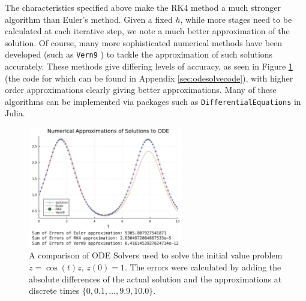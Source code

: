 \documentclass[a4paper,11pt,titlepage]{article}
\theoremstyle{definition}
\theoremstyle{plain}
\theoremstyle{remark}
\begin{document}
The characteristics specified above make the RK4 method a much stronger algorithm than Euler's method. Given a fixed $h$, while more stages need to be calculated at each iterative step, we note a much better approximation of the solution. Of course, many more sophisticated numerical methods have been developed (such as \texttt{Vern9} \cite{verner2010}) to tackle the approximation of such solutions accurately. These methods give differing levels of accuracy, as seen in Figure \ref{fig:odesolver} (the code for which can be found in Appendix \ref{sec:odesolvecode}), with higher order approximations clearly giving better approximations. Many of these algorithms can be implemented via packages such as \texttt{DifferentialEquations} in Julia.

\begin{figure}
    \centering
    \includegraphics[width=0.6\textwidth]{report/figures/ODESolvers.png}
    \caption{A comparison of ODE Solvers used to solve the initial value problem $\dot{z} = \cos(t)z$, $z(0) = 1$. The errors were calculated by adding the absolute differences of the actual solution and the approximations at discrete times $\{0, 0.1, \dots, 9.9, 10.0\}$.}
    \label{fig:odesolver}
\end{figure}
\end{document}
